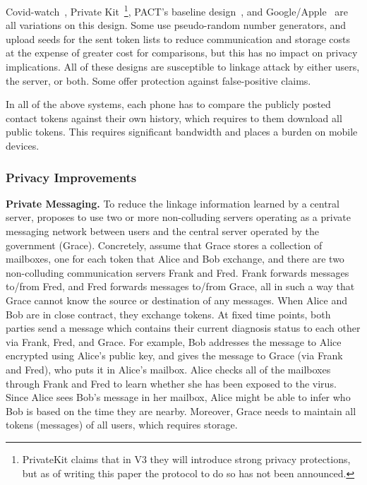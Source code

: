 \documentclass[11pt]{article} %
\begin{document}
{	Covid-watch~\cite{Covid-watch}, Private Kit~\cite{PrivateKit}\footnote{PrivateKit claims that in V3 they will introduce strong privacy protections, but as of writing this paper the protocol to do so has not been announced.}, PACT's baseline design~\cite{chan2020pact}, and Google/Apple~\cite{google-apple} are all variations on this design. Some use pseudo-random number generators, and upload seeds for the sent token lists to reduce communication and storage costs at the expense of greater cost for comparisons, but this has no impact on privacy implications. All of these designs are susceptible to linkage attack by either users, the server, or both. Some offer protection against false-positive claims.
	
	In all of the above systems, each phone has to compare the publicly posted contact tokens against their own history, which requires to them download all public tokens. This requires significant bandwidth and places a burden on mobile devices.
	
	\subsubsection{Privacy Improvements}
	
	\textbf{Private Messaging.} To reduce the linkage information learned by a central server, \cite{cho2020contact} proposes to use two or more non-colluding servers operating as a private messaging network between users and the central server operated by the government (Grace). Concretely, assume that Grace stores a collection of mailboxes, one for each token that Alice and Bob exchange, and there are two non-colluding communication servers Frank and Fred. Frank forwards messages to/from Fred, and Fred forwards messages to/from Grace, all in such a way that Grace cannot know the source or destination of any messages. When Alice and Bob are in close contract, they exchange tokens. At fixed time points, both parties send a message which contains their current diagnosis status to each other via Frank, Fred, and Grace. For example, Bob addresses the
	message to Alice encrypted using Alice's public key, and gives the message to Grace (via Frank and Fred), who puts it in Alice's mailbox. Alice checks all of the mailboxes through Frank and Fred to learn whether she has been exposed to the virus. Since Alice sees Bob's message in her mailbox,  Alice might be able to infer who
	Bob is based on the time they are nearby. Moreover, Grace needs to maintain all tokens (messages) of all users, which requires storage.
	
}
\end{document}
